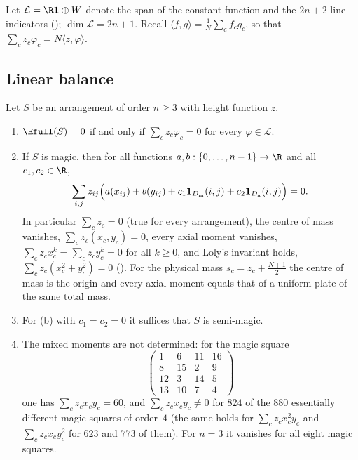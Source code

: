 Let $\mathcal L=\R\mathbf 1\oplus W$ denote the span of the constant function and the $2n+2$ line indicators (); $\dim\mathcal L=2n+1$.
Recall $\langle f,g\rangle=\frac1N\sum_cf_cg_c$, so that $\sum_cz_c\varphi_c=N\langle z,\varphi\rangle$.

\subsection{Linear balance}
\label{sec:balance_linear}

\begin{theorem}
\label{thm:linear_balance}
Let $S$ be an arrangement of order $n\ge3$ with height function $z$.
\begin{enumerate}
\item[(a)] $\Efull(S)=0$ if and only if $\sum_cz_c\varphi_c=0$ for every $\varphi\in\mathcal L$.
\item[(b)] If $S$ is magic, then for all functions $a,b:\{0,\dots,n-1\}\to\R$ and all $c_1,c_2\in\R$,
\begin{equation}
\sum_{i,j}z_{ij}\Bigl(a(x_{ij})+b(y_{ij})+c_1\mathbf 1_{D_{\mathrm m}}(i,j)+c_2\mathbf 1_{D_{\mathrm a}}(i,j)\Bigr)=0 .
\label{eq:linear_balance}
\end{equation}
In particular $\sum_cz_c=0$ (true for every arrangement), the centre of mass vanishes, $\sum_cz_c(x_c,y_c)=0$, every axial moment vanishes, $\sum_cz_cx_c^{k}=\sum_cz_cy_c^{k}=0$ for all $k\ge0$, and Loly's invariant holds, $\sum_cz_c(x_c^2+y_c^2)=0$ ().
For the physical mass $s_c=z_c+\frac{N+1}2$ the centre of mass is the origin and every axial moment equals that of a uniform plate of the same total mass.
\item[(c)] For (b) with $c_1=c_2=0$ it suffices that $S$ is semi-magic.
\item[(d)] The mixed moments are not determined: for the magic square
\[
\begin{pmatrix}1&6&11&16\\8&15&2&9\\12&3&14&5\\13&10&7&4\end{pmatrix}
\]
one has $\sum_cz_cx_cy_c=60$, and $\sum_cz_cx_cy_c\ne0$ for $824$ of the $880$ essentially different magic squares of order~$4$ (the same holds for $\sum_cz_cx_c^2y_c$ and $\sum_cz_cx_cy_c^2$ for $623$ and $773$ of them).
For $n=3$ it vanishes for all eight magic squares.
\end{enumerate}
\end{theorem}

